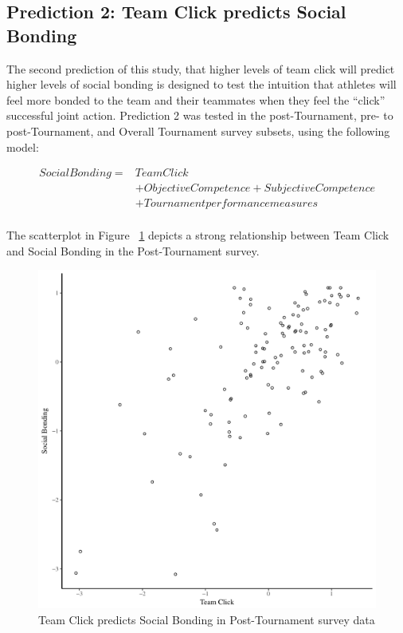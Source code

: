 \begin{CJK}{UTF8}{gbsn}
\subsection{Prediction 2: Team Click predicts Social Bonding}
The second prediction of this study, that higher levels of team click will predict higher levels of social bonding is designed to test the intuition that athletes will feel more bonded to the team and their teammates when they feel the ``click'' successful joint action.  Prediction 2 was tested in the post-Tournament, pre- to post-Tournament, and Overall Tournament survey subsets, using the following model:


    \begin{align*}
      Social Bonding   =& Team Click\\
                      &+ Objective Competence + Subjective Competence  \\
                      &+ Tournament performance measures \\
    \end{align*}

  \bigskip

The scatterplot in Figure ~\ref{fig:clickBondBasicXY} depicts a strong relationship between Team Click and Social Bonding in the Post-Tournament survey.

\begin{figure}[htbp]
  \centering
\includegraphics[scale=.5]{images/clickBondBasicXY.pdf}
  \caption{Team Click predicts Social Bonding in Post-Tournament survey data}
  \label{fig:clickBondBasicXY}
\end{figure}


\end{CJK}
